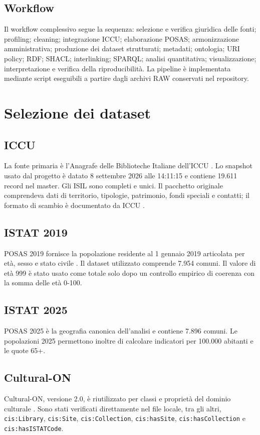 \documentclass[11pt,a4paper]{article}
\begin{document}
\subsection{Workflow}
Il workflow complessivo segue la sequenza: selezione e verifica giuridica delle fonti; profiling; cleaning; integrazione ICCU; elaborazione POSAS; armonizzazione amministrativa; produzione dei dataset strutturati; metadati; ontologia; URI policy; RDF; SHACL; interlinking; SPARQL; analisi quantitativa; visualizzazione; interpretazione e verifica della riproducibilità. La pipeline è implementata mediante script eseguibili a partire dagli archivi RAW conservati nel repository.

\section{Selezione dei dataset}
\subsection{ICCU}
La fonte primaria è l'Anagrafe delle Biblioteche Italiane dell'ICCU \cite{iccu_opendata}. Lo snapshot usato dal progetto è datato 8 settembre 2026 alle 14:11:15 e contiene 19.611 record nel master. Gli ISIL sono completi e unici. Il pacchetto originale comprendeva dati di territorio, tipologie, patrimonio, fondi speciali e contatti; il formato di scambio è documentato da ICCU \cite{iccu_format}.

\subsection{ISTAT 2019}
POSAS 2019 fornisce la popolazione residente al 1 gennaio 2019 articolata per età, sesso e stato civile \cite{istat_posas}. Il dataset utilizzato comprende 7.954 comuni. Il valore di età 999 è stato usato come totale solo dopo un controllo empirico di coerenza con la somma delle età 0-100.

\subsection{ISTAT 2025}
POSAS 2025 è la geografia canonica dell'analisi e contiene 7.896 comuni. Le popolazioni 2025 permettono inoltre di calcolare indicatori per 100.000 abitanti e le quote 65+.

\subsection{Cultural-ON}
Cultural-ON, versione 2.0, è riutilizzato per classi e proprietà del dominio culturale \cite{culturalon}. Sono stati verificati direttamente nel file locale, tra gli altri, \texttt{cis:Library}, \texttt{cis:Site}, \texttt{cis:Collection}, \texttt{cis:hasSite}, \texttt{cis:hasCollection} e \texttt{cis:hasISTATCode}.
\end{document}
